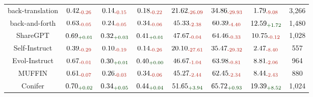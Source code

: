 \begin{table*}[!ht]
{\begin{tabular}{c|ccc|cc|cc}
back-translation & $\text{0.42}_{\textcolor{deepred}{\text{-0.26}}}$ & $\text{0.14}_{\textcolor{deepred}{\text{-0.15}}}$ & $\text{0.18}_{\textcolor{deepred}{\text{-0.22}}}$ & $\text{21.62}_{\textcolor{deepred}{\text{-26.09}}}$ & $\text{34.86}_{\textcolor{deepred}{\text{-29.93}}}$ & $\text{1.79}_{\textcolor{deepred}{\text{-9.08}}}$ &  3,266  \\
back-and-forth & $\text{0.63}_{\textcolor{deepred}{\text{-0.05}}}$ & $\text{0.24}_{\textcolor{deepred}{\text{-0.05}}}$ & $\text{0.34}_{\textcolor{deepred}{\text{-0.06}}}$ & $\text{45.33}_{\textcolor{deepred}{\text{-2.38}}}$ & $\text{60.39}_{\textcolor{deepred}{\text{-4.40}}}$ & $\text{12.59}_{\textcolor{deepgreen}{\text{+1.72}}}$ &  1,480  \\
\midrule
ShareGPT & $\text{0.69}_{\textcolor{deepgreen}{\text{+0.01}}}$ & $\text{0.32}_{\textcolor{deepgreen}{\text{+0.03}}}$ & $\text{0.41}_{\textcolor{deepgreen}{\text{+0.01}}}$ & $\text{47.67}_{\textcolor{deepred}{\text{-0.04}}}$ & $\text{64.46}_{\textcolor{deepred}{\text{-0.33}}}$ & $\text{10.75}_{\textcolor{deepred}{\text{-0.12}}}$ &  1,028  \\
\midrule
Self-Instruct & $\text{0.39}_{\textcolor{deepred}{\text{-0.29}}}$ & $\text{0.10}_{\textcolor{deepred}{\text{-0.19}}}$ & $\text{0.14}_{\textcolor{deepred}{\text{-0.26}}}$ & $\text{20.10}_{\textcolor{deepred}{\text{-27.61}}}$ & $\text{35.47}_{\textcolor{deepred}{\text{-29.32}}}$ & $\text{2.47}_{\textcolor{deepred}{\text{-8.40}}}$ &  557  \\
\midrule
Evol-Instruct & $\text{0.67}_{\textcolor{deepred}{\text{-0.01}}}$ & $\text{0.30}_{\textcolor{deepgreen}{\text{+0.01}}}$ & $\text{0.40}_{\textcolor{deepgreen}{\text{+0.00}}}$ & $\text{46.67}_{\textcolor{deepred}{\text{-1.04}}}$ & $\text{63.98}_{\textcolor{deepred}{\text{-0.81}}}$ & $\text{8.81}_{\textcolor{deepred}{\text{-2.06}}}$ &  964  \\
MUFFIN & $\text{0.61}_{\textcolor{deepred}{\text{-0.07}}}$ & $\text{0.26}_{\textcolor{deepred}{\text{-0.03}}}$ & $\text{0.34}_{\textcolor{deepred}{\text{-0.06}}}$ & $\text{45.27}_{\textcolor{deepred}{\text{-2.44}}}$ & $\text{62.45}_{\textcolor{deepred}{\text{-2.34}}}$ & $\text{8.44}_{\textcolor{deepred}{\text{-2.43}}}$ &  880  \\
Conifer & $\text{0.70}_{\textcolor{deepgreen}{\text{+0.02}}}$ & $\text{0.34}_{\textcolor{deepgreen}{\text{+0.05}}}$ & $\text{0.44}_{\textcolor{deepgreen}{\text{+0.04}}}$ & $\text{51.65}_{\textcolor{deepgreen}{\text{+3.94}}}$ & $\text{65.72}_{\textcolor{deepgreen}{\text{+0.93}}}$ & $\text{19.39}_{\textcolor{deepgreen}{\text{+8.52}}}$ &  1,024  \\

\end{tabular}}
\end{table*}
